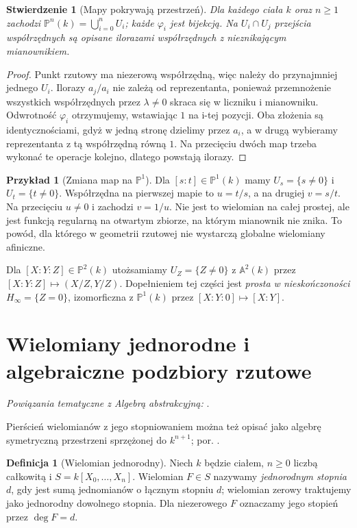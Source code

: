 \documentclass[11pt,a4paper,openany]{report}
\numberwithin{equation}{section}
\theoremstyle{plain}
\newtheorem{stwierdzenie}[twierdzenie]{Stwierdzenie}
\theoremstyle{definition}
\newtheorem{definicja}[twierdzenie]{Definicja}
\newtheorem{przyklad}[twierdzenie]{Przykład}
\theoremstyle{remark}
\newcommand{\A}{\mathbb A}
\newcommand{\PP}{\mathbb P}
\begin{document}
\begin{stwierdzenie}[Mapy pokrywają przestrzeń]
Dla każdego ciała $k$ oraz $n\ge1$ zachodzi
$\PP^n(k)=\bigcup_{i=0}^n U_i$; każde $\varphi_i$
jest bijekcją. Na $U_i\cap U_j$ przejścia współrzędnych
są opisane ilorazami współrzędnych z nieznikającym mianownikiem.
\end{stwierdzenie}
\begin{proof}
Punkt rzutowy ma niezerową współrzędną, więc należy do
przynajmniej jednego $U_i$. Ilorazy $a_j/a_i$ nie zależą
od reprezentanta, ponieważ przemnożenie wszystkich współrzędnych
przez $\lambda\ne0$ skraca się w liczniku i mianowniku.
Odwrotność $\varphi_i$ otrzymujemy, wstawiając $1$ na
i-tej pozycji. Oba złożenia są identycznościami, gdyż w jedną
stronę dzielimy przez $a_i$, a w drugą wybieramy reprezentanta
z tą współrzędną równą $1$. Na przecięciu dwóch map trzeba
wykonać te operacje kolejno, dlatego powstają ilorazy.
\end{proof}

\begin{przyklad}[Zmiana map na $\PP^1$]
Dla $[s:t]\in\PP^1(k)$ mamy $U_s=\{s\ne0\}$ i
$U_t=\{t\ne0\}$. Współrzędna na pierwszej mapie to
$u=t/s$, a na drugiej $v=s/t$. Na przecięciu $u\ne0$
i zachodzi $v=1/u$. Nie jest to wielomian na całej prostej,
ale jest funkcją regularną na otwartym zbiorze, na którym
mianownik nie znika. To powód, dla którego w geometrii
rzutowej nie wystarczą globalne wielomiany afiniczne.
\end{przyklad}

Dla $[X:Y:Z]\in\PP^2(k)$ utożsamiamy
$U_Z=\{Z\ne0\}$ z $\A^2(k)$ przez
$[X:Y:Z]\mapsto(X/Z,Y/Z)$. Dopełnieniem tej części
jest \emph{prosta w nieskończoności} $H_\infty=\{Z=0\}$,
izomorficzna z $\PP^1(k)$ przez $[X:Y:0]\mapsto[X:Y]$.

\section{Wielomiany jednorodne i algebraiczne podzbiory rzutowe}

\noindent\emph{Powiązania tematyczne z Algebrą abstrakcyjną:} .


Pierścień wielomianów z jego stopniowaniem można też opisać jako algebrę symetryczną przestrzeni sprzężonej do $k^{n+1}$; por. .

\begin{definicja}[Wielomian jednorodny]
Niech $k$ będzie ciałem, $n\ge0$ liczbą całkowitą
i $S=k[X_0,\ldots,X_n]$.
Wielomian $F\in S$ nazywamy \emph{jednorodnym stopnia $d$},
gdy jest sumą jednomianów o łącznym stopniu $d$; wielomian
zerowy traktujemy jako jednorodny dowolnego stopnia.
Dla niezerowego $F$ oznaczamy jego stopień przez $\deg F=d$.
\end{definicja}
\end{document}
